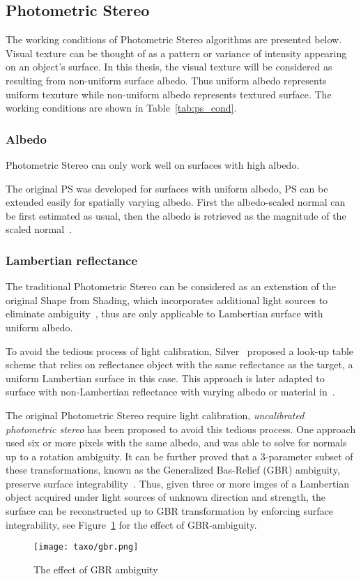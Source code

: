 \subsection{Photometric Stereo}
The working conditions of Photometric Stereo algorithms are presented below. Visual texture can be thought of as a pattern or variance of intensity appearing on an object's surface. In this thesis, the visual texture will be considered as resulting from non-uniform surface albedo. Thus uniform albedo represents uniform texuture while non-uniform albedo represents textured surface. The working conditions are shown in Table~\ref{tab:ps_cond}.

\subsubsection{Albedo}
Photometric Stereo can only work well on surfaces with high albedo.

The original PS was developed for surfaces with uniform albedo, PS can be extended easily for spatially varying albedo. First the albedo-scaled normal can be first estimated as usual, then the albedo is retrieved as the magnitude of the scaled normal~\cite{woodham1980photometric}.

\subsubsection{Lambertian reflectance} %
The traditional Photometric Stereo can be considered as an extenstion of the original Shape from Shading, which incorporates additional light sources to eliminate ambiguity~\cite{woodham1980photometric}, thus are only applicable to Lambertian surface with uniform albedo.

To avoid the tedious process of light calibration, Silver~\cite{silver1980determining} proposed a look-up table scheme that relies on reflectance object with the same reflectance as the target, a uniform Lambertian surface in this case. This approach is later adapted to surface with non-Lambertian reflectance with varying albedo or material in~\cite{hertzmann2005example}.

The original Photometric Stereo require light calibration, \textit{uncalibrated photometric stereo} has been proposed to avoid this tedious process. One approach used six or more pixels with the same albedo, and was able to solve for normals up to a rotation ambiguity\cite{hayakawa1994photometric}. It can be further proved that a 3-parameter subset of these transformations, known as the Generalized Bas-Relief (GBR) ambiguity, preserve surface integrability~\cite{belhumeur1999bas}. Thus, given three or more imges of a Lambertian object acquired under light sources of unknown direction and strength, the surface can be reconstructed up to GBR transformation by enforcing surface integrability, see Figure~\ref{fig:gbr} for the effect of GBR-ambiguity.
\begin{figure}[!htbp]
\centering
\texttt{[image: taxo/gbr.png]}
\caption{The effect of GBR ambiguity}
\label{fig:gbr}
\end{figure}

